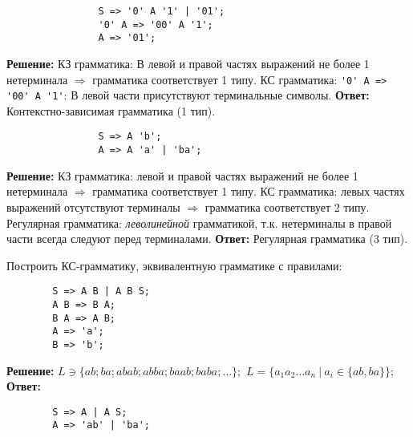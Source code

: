 \documentclass[]{article}
\begin{document}
\begin{enumerate}
\begin{item}
\begin{enumerate}
        \begin{item}
            \begin{lstlisting}
                S => '0' A '1' | '01';
                '0' A => '00' A '1';
                A => '01';
            \end{lstlisting}
            \bigbreak
            \textbf{Решение:}
            \smallbreak
            КЗ грамматика:
            \hfill\break В левой и правой частях выражений не более 1 нетерминала $\Rightarrow$ грамматика соответствует 1 типу.
            \smallbreak
            КС грамматика:
            \hfill\break \lstinline|'0' A => '00' A '1'|: В левой части присутствуют терминальные символы.
            \bigbreak
            \textbf{Ответ:}
            Контекстно-зависимая грамматика (1 тип).
        \end{item}

        \begin{item}
            \begin{lstlisting}
                S => A 'b';
                A => A 'a' | 'ba';
            \end{lstlisting}
            \bigbreak
            \textbf{Решение:}
            \smallbreak
            КЗ грамматика:
            \hfill{} левой и правой частях выражений не более 1 нетерминала $\Rightarrow$ грамматика соответствует 1 типу.
            \smallbreak
            КС грамматика:
            \hfill{} левых частях выражений отсутствуют терминалы $\Rightarrow$ грамматика соответствует 2 типу.
            \smallbreak
            Регулярная грамматика:
            \hfill{} \emph{леволинейной} грамматикой, т.к. нетерминалы в правой части всегда следуют перед терминалами.
            \bigbreak
            \textbf{Ответ:}
            Регулярная грамматика (3 тип).
        \end{item}

    \end{enumerate}
\end{item}

\begin{item}
    Построить КС-грамматику, эквивалентную грамматике с правилами:
    \begin{lstlisting}
        S => A B | A B S;
        A B => B A;
        B A => A B;
        A => 'a';
        B => 'b';
    \end{lstlisting}

    \textbf{Решение:}
    \smallbreak
    $L \ni \{ ab; ba; abab; abba; baab; baba; \dots \};$
    \hfill\break$L = \{ a_1 a_2 \dots a_n \ |\  a_i \in \{ ab, ba \} \};$
    \bigbreak
    \textbf{Ответ:}
    \begin{lstlisting}
        S => A | A S;
        A => 'ab' | 'ba';
    \end{lstlisting}
\end{item}

\end{enumerate}

\end{document}
